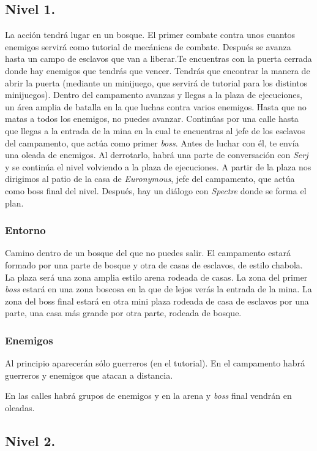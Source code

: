 \documentclass[twoside]{article}
\begin{document}
\subsection{Nivel 1.}
La acción tendrá lugar en un bosque. El primer combate contra unos cuantos enemigos servirá como tutorial de mecánicas de combate. Después se avanza hasta un campo de esclavos que van a liberar.Te encuentras con la puerta cerrada donde hay enemigos que tendrás que vencer. Tendrás que encontrar la manera de abrir la puerta (mediante un minijuego, que servirá de tutorial para los distintos minijuegos). Dentro del campamento avanzas y llegas a la plaza de ejecuciones, un área amplia de batalla en la que luchas contra varios enemigos. Hasta que no matas a todos los enemigos, no puedes avanzar. Continúas por una calle hasta que llegas a la entrada de la mina en la cual te encuentras al jefe de los esclavos del campamento, que actúa como primer \textit{boss}. Antes de luchar con él, te envía una oleada de enemigos. Al derrotarlo, habrá una parte de conversación con \textit{Serj} y se continúa el nivel volviendo a la plaza de ejecuciones. A partir de la plaza nos dirigimos al patio de la casa de \textit{Euronymous}, jefe del campamento, que actúa como boss final del nivel. Después, hay un diálogo con \textit{Spectre} donde se forma el plan. 

\subsubsection{Entorno}
Camino dentro de un bosque del que no puedes salir. El campamento estará formado por una parte de bosque y otra de casas de esclavos, de estilo chabola.  La plaza será una zona amplia estilo arena rodeada de casas. La zona del primer \textit{boss} estará en una zona boscosa en la que de lejos verás la entrada de la mina. La zona del boss final estará en otra mini plaza rodeada de casa de esclavos por una parte, una casa más grande por otra parte, rodeada de bosque.

\subsubsection{Enemigos}
Al principio aparecerán sólo guerreros (en el tutorial). En el campamento habrá guerreros y enemigos que atacan a distancia. 

En las calles habrá grupos de enemigos y en la arena y \textit{boss} final vendrán en oleadas.

\subsection{Nivel 2.}
\end{document}
